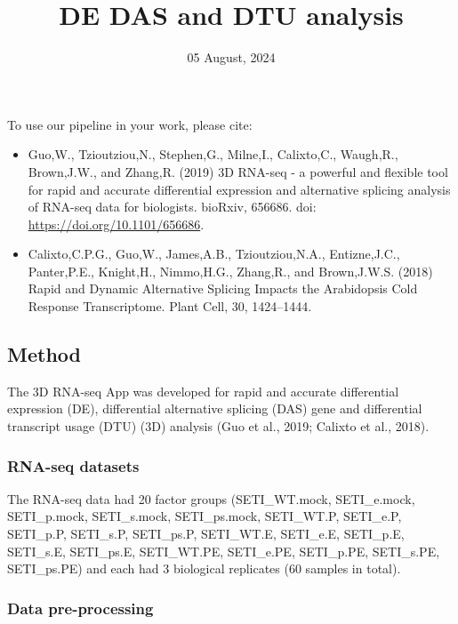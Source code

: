 \documentclass[]{article}
\title{DE DAS and DTU analysis}
\author{}
\date{\vspace{-2.5em}05 August, 2024}
\providecommand{\tightlist}{%
  \setlength{\itemsep}{0pt}\setlength{\parskip}{0pt}}
\begin{document}
\maketitle

{
\setcounter{tocdepth}{4}
\tableofcontents
}
To use our pipeline in your work, please cite:

\begin{itemize}
\tightlist
\item
  Guo,W., Tzioutziou,N., Stephen,G., Milne,I., Calixto,C., Waugh,R.,
  Brown,J.W., and Zhang,R. (2019) 3D RNA-seq - a powerful and flexible
  tool for rapid and accurate differential expression and alternative
  splicing analysis of RNA-seq data for biologists. bioRxiv, 656686.
  doi: \url{https://doi.org/10.1101/656686}.
\item
  Calixto,C.P.G., Guo,W., James,A.B., Tzioutziou,N.A., Entizne,J.C.,
  Panter,P.E., Knight,H., Nimmo,H.G., Zhang,R., and Brown,J.W.S. (2018)
  Rapid and Dynamic Alternative Splicing Impacts the Arabidopsis Cold
  Response Transcriptome. Plant Cell, 30, 1424--1444.
\end{itemize}

\subsection{Method}\label{method}

The 3D RNA-seq App was developed for rapid and accurate differential
expression (DE), differential alternative splicing (DAS) gene and
differential transcript usage (DTU) (3D) analysis (Guo et al., 2019;
Calixto et al., 2018).

\subsubsection{RNA-seq datasets}\label{rna-seq-datasets}

The RNA-seq data had 20 factor groups (SETI\_WT.mock, SETI\_e.mock,
SETI\_p.mock, SETI\_s.mock, SETI\_ps.mock, SETI\_WT.P, SETI\_e.P,
SETI\_p.P, SETI\_s.P, SETI\_ps.P, SETI\_WT.E, SETI\_e.E, SETI\_p.E,
SETI\_s.E, SETI\_ps.E, SETI\_WT.PE, SETI\_e.PE, SETI\_p.PE, SETI\_s.PE,
SETI\_ps.PE) and each had 3 biological replicates (60 samples in total).

\subsubsection{Data pre-processing}\label{data-pre-processing}
\end{document}
